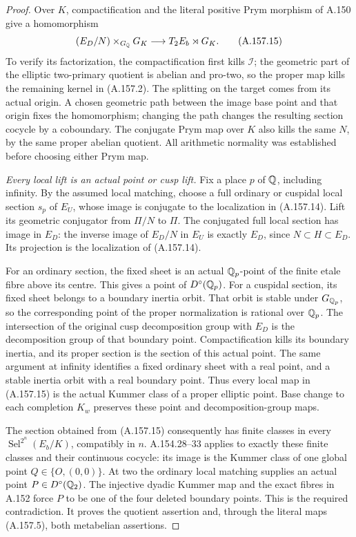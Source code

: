 \begin{proof}
Over \(K\), compactification and the literal positive
Prym morphism of A.150 give a homomorphism
\[
 (E_D/N)\times_{G_\mathbb Q}G_K
                      \longrightarrow T_2E_b\rtimes G_K.
\tag{A.157.15}
\]
To verify its factorization, the compactification
first kills \(\mathcal I\); the geometric part of
the elliptic two-primary quotient is abelian and
pro-two, so the proper map kills the remaining
kernel in (A.157.2).  The splitting on the target
comes from its actual origin.  A chosen geometric
path between the image base point and that origin
fixes the homomorphism; changing the path changes
the resulting section cocycle by a coboundary.
The conjugate Prym map over \(K\) also kills the
same \(N\), by the same proper abelian quotient.
All arithmetic normality was established before
choosing either Prym map.

\emph{Every local lift is an actual point or cusp lift.}
Fix a place \(p\) of \(\mathbb Q\), including infinity.
By the assumed local matching, choose a full ordinary
or cuspidal local section \(s_p\) of \(E_U\), whose
image is conjugate to the localization in (A.157.14).
Lift its geometric conjugator from \(\Pi/N\) to
\(\Pi\).  The conjugated full local section has image
in \(E_D\): the inverse image of \(E_D/N\) in \(E_U\)
is exactly \(E_D\), since \(N\subset H\subset E_D\).
Its projection is the localization of (A.157.14).

For an ordinary section, the fixed sheet is an actual
\(\mathbb Q_p\)-point of the finite etale fibre above its
centre.  This gives a point of \(D^\circ(\mathbb Q_p)\).
For a cuspidal section, its fixed sheet belongs to a
boundary inertia orbit.  That orbit is stable under
\(G_{\mathbb Q_p}\), so the corresponding point of the
proper normalization is rational over \(\mathbb Q_p\).
The intersection of the original cusp decomposition
group with \(E_D\) is the decomposition group of
that boundary point.  Compactification kills its
boundary inertia, and its proper section is the
section of this actual point.  The same argument
at infinity identifies a fixed ordinary sheet with
a real point, and a stable inertia orbit with a
real boundary point.  Thus every local map in
(A.157.15) is the actual Kummer class of a proper
elliptic point.  Base change to each completion
\(K_w\) preserves these point and decomposition-group
maps.

The section obtained from (A.157.15) consequently
has finite classes in every
\(\operatorname{Sel}^{2^n}(E_b/K)\), compatibly in
\(n\).  A.154.28--33 applies to exactly these finite
classes and their continuous cocycle: its image is
the Kummer class of one global point
\(Q\in\{O,(0,0)\}\).  At two the ordinary local
matching supplies an actual point
\(P\in D^\circ(\mathbb Q_2)\).  The injective dyadic
Kummer map and the exact fibres in A.152 force
\(P\) to be one of the four deleted boundary
points.  This is the required contradiction.
It proves the quotient assertion and, through the
literal maps (A.157.5), both metabelian assertions.


\end{proof}
